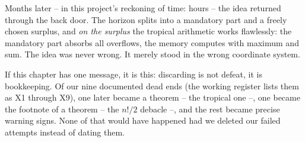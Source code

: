 Months later -- in this project's reckoning of time: hours -- the
idea returned through the back door. The horizon splits into a
mandatory part and a freely chosen surplus, and \emph{on the
surplus} the tropical arithmetic works flawlessly: the mandatory
part absorbs all overflows, the memory computes with maximum and
sum. The idea was never wrong. It merely stood in the wrong
coordinate system.

\begin{oberflaeche}
If this chapter has one message, it is this: discarding is not
defeat, it is bookkeeping. Of our nine documented dead ends (the
working register lists them as X1 through X9), one later became a
theorem -- the tropical one --, one became the footnote of a
theorem -- the $n!/2$ debacle --, and the rest became precise
warning signs. None of that would have happened had we deleted our
failed attempts instead of dating them.
\end{oberflaeche}
